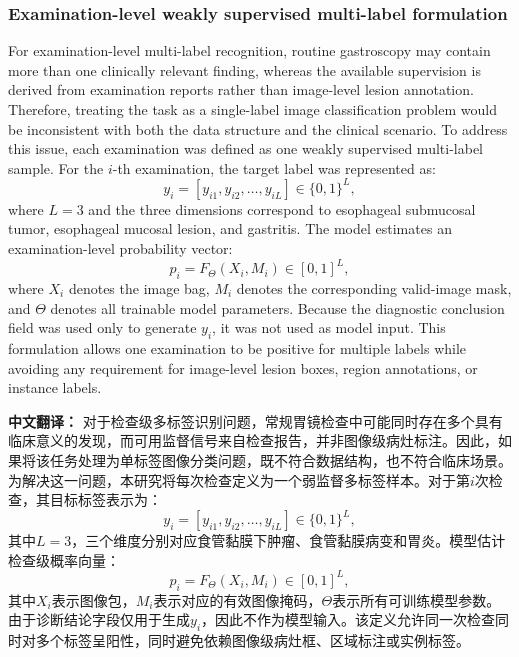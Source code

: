 \documentclass[Afour,sagev,times]{sagej}
\begin{document}
\subsubsection{Examination-level weakly supervised multi-label formulation}
For examination-level multi-label recognition, routine gastroscopy may contain more than one clinically relevant finding, whereas the available supervision is derived from examination reports rather than image-level lesion annotation. Therefore, treating the task as a single-label image classification problem would be inconsistent with both the data structure and the clinical scenario. To address this issue, each examination was defined as one weakly supervised multi-label sample. For the $i$-th examination, the target label was represented as:
\begin{equation}
y_i = [y_{i1},y_{i2},\ldots,y_{iL}] \in \{0,1\}^{L},
\end{equation}
where $L=3$ and the three dimensions correspond to esophageal submucosal tumor, esophageal mucosal lesion, and gastritis. The model estimates an examination-level probability vector:
\begin{equation}
p_i = F_{\Theta}(X_i, M_i) \in [0,1]^{L},
\end{equation}
where $X_i$ denotes the image bag, $M_i$ denotes the corresponding valid-image mask, and $\Theta$ denotes all trainable model parameters. Because the diagnostic conclusion field was used only to generate $y_i$, it was not used as model input. This formulation allows one examination to be positive for multiple labels while avoiding any requirement for image-level lesion boxes, region annotations, or instance labels.

\textbf{中文翻译：} 对于检查级多标签识别问题，常规胃镜检查中可能同时存在多个具有临床意义的发现，而可用监督信号来自检查报告，并非图像级病灶标注。因此，如果将该任务处理为单标签图像分类问题，既不符合数据结构，也不符合临床场景。为解决这一问题，本研究将每次检查定义为一个弱监督多标签样本。对于第$i$次检查，其目标标签表示为：
\begin{equation}
y_i = [y_{i1},y_{i2},\ldots,y_{iL}] \in \{0,1\}^{L},
\end{equation}
其中$L=3$，三个维度分别对应食管黏膜下肿瘤、食管黏膜病变和胃炎。模型估计检查级概率向量：
\begin{equation}
p_i = F_{\Theta}(X_i, M_i) \in [0,1]^{L},
\end{equation}
其中$X_i$表示图像包，$M_i$表示对应的有效图像掩码，$\Theta$表示所有可训练模型参数。由于诊断结论字段仅用于生成$y_i$，因此不作为模型输入。该定义允许同一次检查同时对多个标签呈阳性，同时避免依赖图像级病灶框、区域标注或实例标签。
\end{document}
